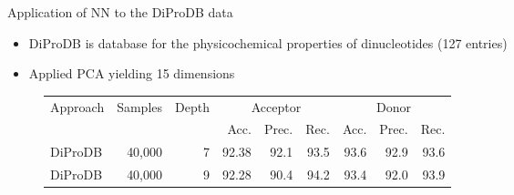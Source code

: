 \documentclass[10pt]{beamer}
\begin{document}
\begin{frame}{Application of NN to the DiProDB data}
	\begin{itemize}
		\item DiProDB is database for the physicochemical properties of dinucleotides (127 entries)
		\item Applied PCA yielding 15 dimensions
	\end{itemize}
	\pause
		\begin{figure}
		\small
		\centering
		\begingroup
		\def\arraystretch{1.2}
		\begin{tabular}{|l|r|r|r|r|r|r|r|r|}
			\hline
			Approach & Samples & Depth & \multicolumn{3}{|c|}{Acceptor} & \multicolumn{3}{c|}{Donor} \\
			\cline{4-9}
			&&& Acc. & Prec. & Rec. & Acc. & Prec. & Rec. \\
			\hline
			DiProDB & 40,000 & 7 & 92.38 & 92.1 & 93.5 & 93.6 & 92.9 & 93.6 \\
			DiProDB & 40,000 & 9 & 92.28 & 90.4 & 94.2 & 93.4 & 92.0 & 93.9 \\
			
			\hline  
		\end{tabular}
		\endgroup
	\end{figure}
\end{frame}
\end{document}
